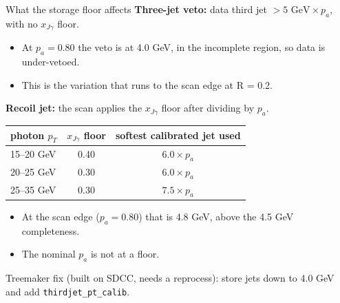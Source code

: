 \documentclass[aspectratio=169,10pt]{beamer}
\newcommand{\pa}{p_{a}}
\newcommand{\xjg}{x_{J\gamma}}
\begin{document}
\begin{frame}{What the storage floor affects}
  \small
  \textbf{Three-jet veto:} data third jet $> 5\text{ GeV} \times \pa$, with no $\xjg$ floor.
  \begin{itemize}
    \item At $\pa = 0.80$ the veto is at 4.0 GeV, in the incomplete region, so data is under-vetoed.
    \item This is the variation that runs to the scan edge at R = 0.2.
  \end{itemize}
  \vspace{0.5em}
  \textbf{Recoil jet:} the scan applies the $\xjg$ floor after dividing by $\pa$.
  \vspace{0.3em}

  \centering
  \begin{tabular}{lcc}
    \toprule
    photon $p_T$ & $\xjg$ floor & softest calibrated jet used \\
    \midrule
    15--20 GeV & 0.40 & $6.0 \times \pa$ \\
    20--25 GeV & 0.30 & $6.0 \times \pa$ \\
    25--35 GeV & 0.30 & $7.5 \times \pa$ \\
    \bottomrule
  \end{tabular}
  \vspace{0.3em}
  \begin{itemize}
    \item At the scan edge ($\pa = 0.80$) that is 4.8 GeV, above the 4.5 GeV completeness.
    \item The nominal $\pa$ is not at a floor.
  \end{itemize}
  \vspace{0.3em}
  \raggedright
  Treemaker fix (built on SDCC, needs a reprocess): store jets down to 4.0 GeV and add \texttt{thirdjet\_pt\_calib}.
\end{frame}
\end{document}
